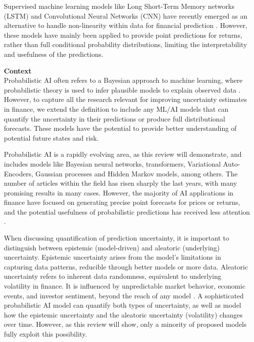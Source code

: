 Supervised machine learning models like Long Short-Term Memory networks (LSTM) and Convolutional Neural Networks (CNN) have recently emerged as an alternative to handle non-linearity within data for financial prediction \parencite{Tang2022Survey}. However, these models have mainly been applied to provide point predictions for returns, rather than full conditional probability distributions, limiting the interpretability and usefulness of the predictions.

\textbf{Context}\\
Probabilistic AI often refers to a Bayesian approach to machine learning, where probabilistic theory is used to infer plausible models to explain observed data \parencite{Ghahramani2015}. However, to capture all the research relevant for improving uncertainty estimates in finance, we extend the definition to include any ML/AI models that can quantify the uncertainty in their predictions or produce full distributional forecasts. These models have the potential to provide better understanding of potential future states and risk.

Probabilistic AI is a rapidly evolving area, as this review will demonstrate, and includes models like Bayesian neural networks, transformers, Variational Auto-Encoders, Gaussian processes and Hidden Markov models, among others. The number of articles within the field has risen sharply the last years, with many promising results in many cases. However, the majority of AI applications in finance have focused on generating precise point forecasts for prices or returns, and the potential usefulness of probabilistic predictions has received less attention \parencite{sezer2020financial}.

When discussing quantification of prediction uncertainty, it is important to distinguish between epistemic (model-driven) and aleatoric (underlying) uncertainty. Epistemic uncertainty arises from the model's limitations in capturing data patterns, reducible through better models or more data. Aleatoric uncertainty refers to inherent data randomness, equivalent to underlying volatility in finance. It is influenced by unpredictable market behavior, economic events, and investor sentiment, beyond the reach of any model \parencite[7,34]{pml1Book, KIUREGHIAN2009105, hullermeier2021aleatoric}. A sophisticated probabilistic AI model can quantify both types of uncertainty, as well as model how the epistemic uncertainty and the aleatoric uncertainty (volatility) changes over time. However, as this review will show, only a minority of proposed models fully exploit this possibility.


